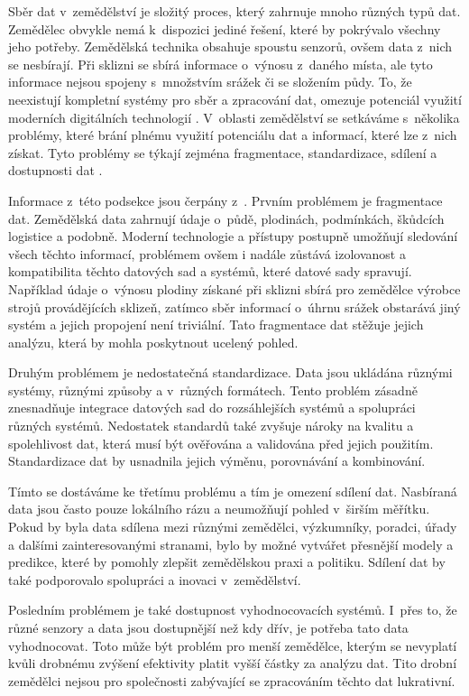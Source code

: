 \label{1_1_data_collection}
Sběr dat v~zemědělství je složitý proces, který zahrnuje mnoho různých typů dat. Zemědělec obvykle nemá k~dispozici jediné řešení, které by pokrývalo všechny jeho potřeby. Zemědělská technika obsahuje spoustu senzorů, ovšem data z~nich se nesbírají. Při sklizni se sbírá informace o~výnosu z~daného místa, ale tyto informace nejsou spojeny s~množstvím srážek či se složením půdy. To, že neexistují kompletní systémy pro sběr a zpracování dat, omezuje potenciál využití moderních digitálních technologií \cite{BDIA_POV1}. V~oblasti zemědělství se setkáváme s~několika problémy, které brání plnému využití potenciálu dat a informací, které lze z~nich získat. Tyto problémy se týkají zejména fragmentace, standardizace, sdílení a dostupnosti dat \cite{DCAP}\cite{BDPP}.

Informace z~této podsekce jsou čerpány z~\cite{DCAP}. Prvním problémem je fragmentace dat. Zemědělská data zahrnují údaje o~půdě, plodinách, podmínkách, škůdcích logistice a podobně. Moderní technologie a přístupy postupně umožňují sledování všech těchto informací, problémem ovšem i nadále zůstává izolovanost a kompatibilita těchto datových sad a systémů, které datové sady spravují. Například údaje o~výnosu plodiny získané při sklizni sbírá pro zemědělce výrobce strojů provádějících sklizeň, zatímco sběr informací o~úhrnu srážek obstarává jiný systém a jejich propojení není triviální. Tato fragmentace dat stěžuje jejich analýzu, která by mohla poskytnout ucelený pohled.

Druhým problémem je nedostatečná standardizace. Data jsou ukládána různými systémy, různými způsoby a v~různých formátech. Tento problém zásadně znesnadňuje integrace datových sad do rozsáhlejších systémů a spolupráci různých systémů. Nedostatek standardů také zvyšuje nároky na kvalitu a spolehlivost dat, která musí být ověřována a validována před jejich použitím. Standardizace dat by usnadnila jejich výměnu, porovnávání a kombinování.

Tímto se dostáváme ke třetímu problému a tím je omezení sdílení dat. Nasbíraná data jsou často pouze lokálního rázu a neumožňují pohled v~širším měřítku.  Pokud by byla data sdílena mezi různými zemědělci, výzkumníky, poradci, úřady a dalšími zainteresovanými stranami, bylo by možné vytvářet přesnější modely a predikce, které by pomohly zlepšit zemědělskou praxi a politiku. Sdílení dat by také podporovalo spolupráci a inovaci v~zemědělství.

Posledním problémem je také dostupnost vyhodnocovacích systémů. I~přes to, že různé senzory a data jsou dostupnější než kdy dřív, je potřeba tato data vyhodnocovat. Toto může být problém pro menší zemědělce, kterým se nevyplatí kvůli drobnému zvýšení efektivity platit vyšší částky za analýzu dat. Tito drobní zemědělci nejsou pro společnosti zabývající se zpracováním těchto dat lukrativní.

